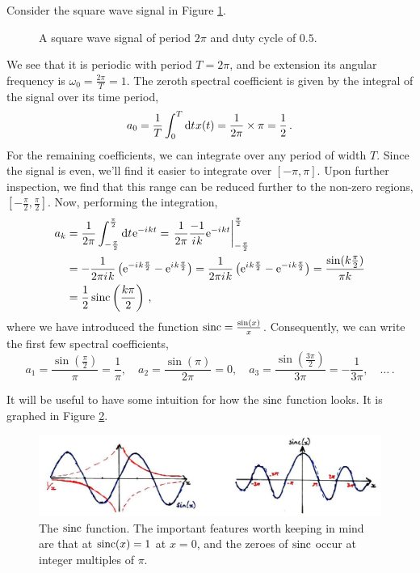 \begin{exmp}
  Consider the square wave signal in Figure \ref{fig::lecture_4_square_wave}.
  \begin{figure}[!htb]
    \caption{
      A square wave signal of period $2\pi$ and duty cycle of $0.5$.
    }
    \label{fig::lecture_4_square_wave}
  \end{figure}
  We see that it is periodic with period $T = 2\pi$, and be extension its
  angular frequency is $\omega_0 = \frac{2\pi}{T} = 1$. The zeroth spectral
  coefficient is given by the integral of the signal over its time period,
  \begin{displaymath}
    a_0 = \frac{1}{T}\int_0^T\mathrm{d}t\mkern1mu x(t) = \frac{1}{2\pi}\times\pi = \frac{1}{2} \,.
  \end{displaymath}
  For the remaining coefficients, we can integrate over any period of width $T$.
  Since the signal is even, we'll find it easier to integrate over $[-\pi,\pi]$.
  Upon further inspection, we find that this range can be reduced further to
  the non-zero regions, $[-\frac{\pi}{2},\frac{\pi}{2}]$. Now, performing the
  integration,
  \begin{align*}
    a_k &= \frac{1}{2\pi}\int_{-\frac{\pi}{2}}^{\frac{\pi}{2}} \mathrm{d}t\mkern1mu\mathrm{e}^{-{i\mkern1mu} kt}
    = \left.\frac{1}{2\pi}\frac{-1}{{i\mkern1mu} k}\mathrm{e}^{-{i\mkern1mu} kt}\right|_{-\frac{\pi}{2}}^{\frac{\pi}{2}} \\
    &= -\frac{1}{2\pi{i\mkern1mu} k}\left(\mathrm{e}^{-{i\mkern1mu} k\frac{\pi}{2}} - \mathrm{e}^{{i\mkern1mu} k\frac{\pi}{2}}\right)
    = \frac{1}{2\pi{i\mkern1mu} k}\left(\mathrm{e}^{{i\mkern1mu} k\frac{\pi}{2}} - \mathrm{e}^{-{i\mkern1mu} k\frac{\pi}{2}}\right)
    = \frac{\sin(k\frac{\pi}{2})}{\pi k} \\
    &= \frac{1}{2}\operatorname{sinc}\left(\frac{k\pi}{2}\right) \,,
  \end{align*}
  where we have introduced the function $\operatorname{sinc} = \frac{\sin(x)}{x}$. Consequently,
  we can write the first few spectral coefficients,
  \begin{displaymath}
    a_1 = \frac{\sin\left(\frac{\pi}{2}\right)}{\pi} = \frac{1}{\pi}, \quad
    a_2 = \frac{\sin(\pi)}{2\pi} = 0, \quad
    a_3 = \frac{\sin\left(\frac{3\pi}{2}\right)}{3\pi} = -\frac{1}{3\pi}, \quad\hdots \,.
  \end{displaymath}
\end{exmp}
%
It will be useful to have some intuition for how the $\operatorname{sinc}$ function looks. It is
graphed in Figure \ref{fig::lecture_4_sinc}.
%
\begin{figure}[!htb]
  \includegraphics[width=\textwidth]{images/lecture_4_sinc.JPG}
  \caption{
    The $\operatorname{sinc}$ function. The important features worth keeping in mind are
    that at $\operatorname{sinc}(x) = 1$ at $x=0$, and the zeroes of $\operatorname{sinc}$ occur at
    integer multiples of $\pi$.
  }
  \label{fig::lecture_4_sinc}
\end{figure}

